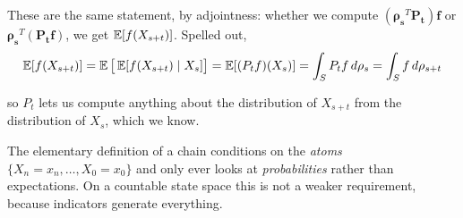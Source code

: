 	These are the same statement, by adjointness: whether we compute $(\boldsymbol{\rho_s}^T \mathbf{P_t}) \mathbf{f}$ or $\boldsymbol{\rho_s}^T (\mathbf{P_t} \mathbf{f})$, we get $\operatorname{\mathbb{E}}[f(X_{s+t})]$. Spelled out,
	\begin{equation}
		\operatorname{\mathbb{E}}[f(X_{s + t})] = \operatorname{\mathbb{E}}\big[ \operatorname{\mathbb{E}}[f(X_{s+t}) \mid X_s] \big] = \operatorname{\mathbb{E}}[(P_t f)(X_s)] = \int_S P_t f \, d\rho_s = \int_S f \, d\rho_{s+t}
	\end{equation}

	so $P_t$ lets us compute anything about the distribution of $X_{s+t}$ from the distribution of $X_s$, which we know.

	The elementary definition of a chain conditions on the \textit{atoms} $\{X_n = x_n, \ldots, X_0 = x_0\}$ and only ever looks at \textit{probabilities} rather than expectations. On a countable state space this is not a weaker requirement, because indicators generate everything.

